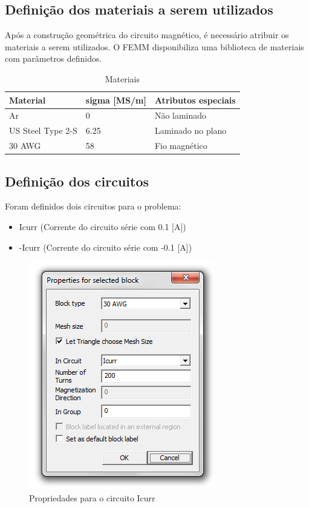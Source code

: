 \subsection{Definição dos materiais a serem utilizados}
Após a construção geométrica do circuito magnético, é necessário atribuir os materiais a serem utilizados. O FEMM disponibiliza uma biblioteca de materiais com parâmetros definidos.
\begin{table}[H]
\centering
\caption{Materiais}
\label{mat}
\begin{tabular}{lll}
\hline
\textbf{Material} & \textbf{sigma {[}MS/m{]}} & \textbf{Atributos especiais} \\ \hline
Ar                & 0                         & Não laminado                 \\
US Steel Type 2-S & 6.25                      & Laminado no plano            \\
30 AWG            & 58                        & Fio magnético                \\ \hline
\end{tabular}
\end{table}


\subsection{Definição dos circuitos}
Foram definidos dois circuitos para o problema:
\begin{itemize}
\item Icurr (Corrente do circuito série com 0.1 [A])
\item -Icurr (Corrente do circuito série com -0.1 [A])
\end{itemize}

\begin{figure}[H]
\centering
\includegraphics[scale=1]{img/circ_1.png}
\caption[Propriedades para o circuito Icurr]{Propriedades para o circuito Icurr}
\label{icurr_p}
\end{figure}

